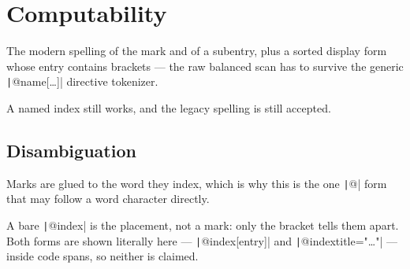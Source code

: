 \section{Computability}

The modern spelling of the mark and of a
subentry, plus a sorted display form
whose entry contains brackets — the raw balanced
scan has to survive the generic \texttt|@name[…]| directive tokenizer.

A named index still works, and the
legacy spelling is still accepted.

\subsection{Disambiguation}

Marks are glued to the word they index, which is why this is the one \texttt|@|
form that may follow a word character directly.

A bare \texttt|@index| is the placement, not a mark: only the bracket tells them
apart. Both forms are shown literally here — \texttt|@index[entry]| and
\texttt|@index{title="…"}| — inside code spans, so neither is claimed.

\printindex

\printindex[authors]

